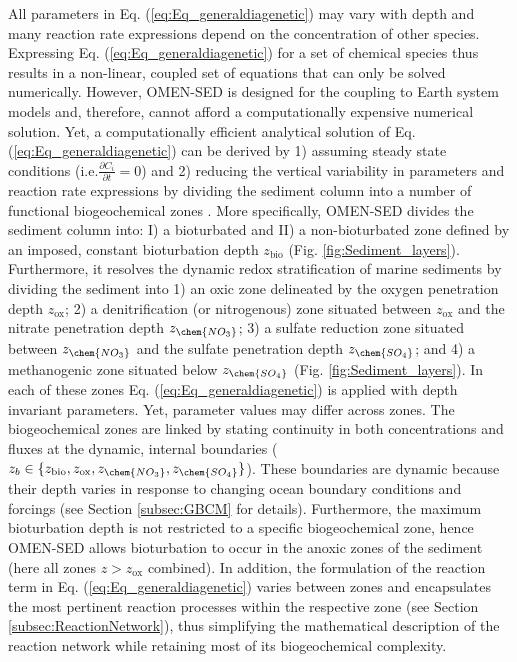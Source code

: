 \documentclass[gmd, manuscript]{copernicus}
\begin{document}
All parameters in Eq. (\ref{eq:Eq_generaldiagenetic}) may vary with depth and many reaction rate expressions depend on the concentration of other species. 
Expressing Eq. (\ref{eq:Eq_generaldiagenetic}) for a set of chemical species thus results in a non-linear, coupled set of equations that can only 
be solved numerically. 
However, OMEN-SED is designed for the coupling to Earth system models and, therefore, cannot afford a computationally expensive numerical solution. 
Yet, a computationally efficient analytical solution of Eq. (\ref{eq:Eq_generaldiagenetic}) can be derived by 1) assuming steady state conditions (i.e.$ \frac{\partial C_i}{\partial t}=0$) 
and 2) reducing the vertical variability in parameters and reaction rate expressions by dividing the sediment column into a number of functional 
biogeochemical zones \citep[Fig. \ref{fig:Sediment_layers}, compare e.g. ][for similar solutions]{billen1982idealized, goloway_diagenetic_1982, tromp_global_1995, gypens_simple_2008}. 
More specifically, OMEN-SED divides the sediment column into: I) a bioturbated and 
II) a non-bioturbated zone defined by an imposed, constant bioturbation depth $z_{\mathrm{bio}}$ (Fig. \ref{fig:Sediment_layers}). Furthermore, it resolves the dynamic redox stratification of marine sediments by dividing 
the sediment into 1) an oxic zone delineated by the oxygen penetration depth $z_{\mathrm{ox}}$; 2) a denitrification (or nitrogenous) zone situated between $z_{\mathrm{ox}}$ and the nitrate penetration depth $z_{\chem{NO_3}}$;
3) a sulfate reduction zone situated between $z_{\chem{NO_3}}$ and the sulfate penetration depth $z_{\chem{SO_4}}$; and 4) a methanogenic zone situated below $z_{\chem{SO_4}}$ (Fig. \ref{fig:Sediment_layers}).  
In each of these zones Eq. (\ref{eq:Eq_generaldiagenetic}) is applied with depth invariant parameters. Yet, parameter values may differ across zones. 
The biogeochemical zones are linked by stating continuity in both concentrations and fluxes at the dynamic, internal boundaries 
($z_b \in \{z_{\mathrm{bio}}, z_{\mathrm{ox}}, z_{\chem{NO_3}}, z_{\chem{SO_4}} \}$). These boundaries are dynamic because their depth varies in response to changing ocean 
boundary conditions and forcings (see Section \ref{subsec:GBCM} for details). Furthermore, the maximum bioturbation depth is not restricted to a specific biogeochemical zone, 
hence OMEN-SED allows bioturbation to occur in the anoxic zones of the sediment (here all zones $z > z_{\mathrm{ox}}$ combined). 
In addition, the formulation of the reaction term in Eq. (\ref{eq:Eq_generaldiagenetic}) varies between zones and encapsulates the most pertinent reaction 
processes within the respective zone (see Section \ref{subsec:ReactionNetwork}), thus simplifying the mathematical description of the reaction network while 
retaining most of its biogeochemical complexity.
\end{document}
